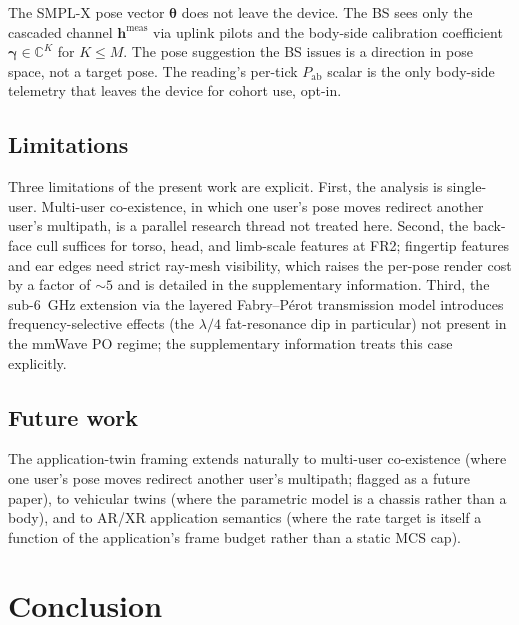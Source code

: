 \documentclass[journal,twocolumn,10pt]{IEEEtran}
\theoremstyle{plain}
\theoremstyle{definition}
\theoremstyle{remark}
\newcommand{\hh}{\mathbf{h}}
\newcommand{\Pabs}{P_{\mathrm{ab}}}
\newcommand{\thetab}{\bm{\theta}}
\newcommand{\gammab}{\bm{\gamma}}
\newcommand{\Complex}{\mathbb{C}}
\begin{document}
The SMPL-X pose vector $\thetab$ does not leave the device. The BS
sees only the cascaded channel $\hh^{\mathrm{meas}}$ via uplink
pilots and the body-side calibration coefficient $\gammab \in
\Complex^{K}$ for $K \leq M$. The pose suggestion the BS issues is
a direction in pose space, not a target pose. The reading's per-tick
$\Pabs$ scalar is the only body-side telemetry that leaves the
device for cohort use, opt-in.

\subsection{Limitations}

Three limitations of the present work are explicit.
First, the analysis is single-user. Multi-user co-existence, in which
one user's pose moves redirect another user's multipath, is a
parallel research thread not treated here.
Second, the back-face cull suffices for torso, head, and limb-scale
features at FR2; fingertip features and ear edges need strict
ray-mesh visibility, which raises the per-pose render cost by a
factor of $\sim\!5$ and is detailed in the supplementary information.
Third, the sub-6~GHz extension via the layered Fabry--P\'erot
transmission model introduces frequency-selective effects (the
$\lambda/4$ fat-resonance dip in particular) not present in the
mmWave PO regime; the supplementary information treats this case
explicitly.

\subsection{Future work}

The application-twin framing extends naturally to multi-user
co-existence (where one user's pose moves redirect another user's
multipath; flagged as a future paper), to vehicular twins (where the
parametric model is a chassis rather than a body), and to AR/XR
application semantics (where the rate target is itself a function
of the application's frame budget rather than a static MCS cap).


\section{Conclusion}\label{sec:conclusion}
\end{document}
